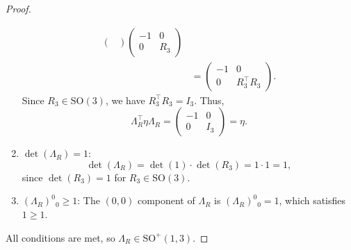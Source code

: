 \documentclass{amsart}
\theoremstyle{definition}
\theoremstyle{remark}
\begin{document}
\begin{proof}
\begin{enumerate}
\begin{align*}
\begin{pmatrix}
          \end{pmatrix}
          \begin{pmatrix}
            -1 & 0 \\
            0 & R_3
          \end{pmatrix} \\
          &=
          \begin{pmatrix}
            -1 & 0 \\
            0 & R_3^\top R_3
          \end{pmatrix}.
        \end{align*}
      Since $R_3 \in \mathrm{SO}(3)$, we have $R_3^\top R_3 = I_3$. Thus,
      \begin{equation*}
        \Lambda_R^\top\eta \Lambda_R =
        \begin{pmatrix}
          -1 & 0 \\
          0 & I_3
        \end{pmatrix}
        = \eta.
      \end{equation*}
      \item $\det(\Lambda_R) = 1$:
      \begin{equation*}
        \det(\Lambda_R) = \det(1) \cdot \det(R_3) = 1 \cdot 1 = 1,
      \end{equation*}
      since $\det(R_3)=1$ for $R_3 \in \mathrm{SO}(3)$.
      \item $(\Lambda_R)^0{}_0 \geq 1$:
      The $(0,0)$ component of $\Lambda_R$ is $(\Lambda_R)^0{}_0 = 1$, which satisfies $1 \geq 1$.
  \end{enumerate}
  All conditions are met, so $\Lambda_R \in \mathrm{SO}^+(1,3)$.
\end{proof}
\end{document}
